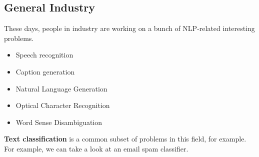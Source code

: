 \documentclass[english, 10pt]{article}
\begin{document}
\subsection{General Industry}

These days, people in industry are working on a bunch of NLP-related interesting problems.

\begin{itemize}
	\item Speech recognition
	\item Caption generation
	\item Natural Language Generation
	\item Optical Character Recognition
	\item Word Sense Disambiguation
\end{itemize}

\textbf{Text classification} is a common subset of problems in this field, for example. For example, we can take a look at an email spam classifier.\\
\end{document}
